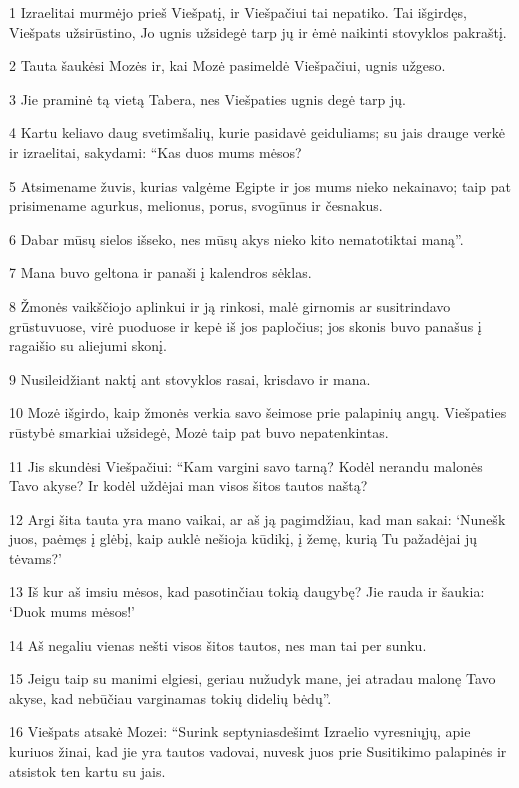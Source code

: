 \par 1 Izraelitai murmėjo prieš Viešpatį, ir Viešpačiui tai nepatiko. Tai išgirdęs, Viešpats užsirūstino, Jo ugnis užsidegė tarp jų ir ėmė naikinti stovyklos pakraštį. 
\par 2 Tauta šaukėsi Mozės ir, kai Mozė pasimeldė Viešpačiui, ugnis užgeso. 
\par 3 Jie praminė tą vietą Tabera, nes Viešpaties ugnis degė tarp jų. 
\par 4 Kartu keliavo daug svetimšalių, kurie pasidavė geiduliams; su jais drauge verkė ir izraelitai, sakydami: “Kas duos mums mėsos? 
\par 5 Atsimename žuvis, kurias valgėme Egipte ir jos mums nieko nekainavo; taip pat prisimename agurkus, melionus, porus, svogūnus ir česnakus. 
\par 6 Dabar mūsų sielos išseko, nes mūsų akys nieko kito nemato­tiktai maną”. 
\par 7 Mana buvo geltona ir panaši į kalendros sėklas. 
\par 8 Žmonės vaikščiojo aplinkui ir ją rinkosi, malė girnomis ar susitrindavo grūstuvuose, virė puoduose ir kepė iš jos papločius; jos skonis buvo panašus į ragaišio su aliejumi skonį. 
\par 9 Nusileidžiant naktį ant stovyklos rasai, krisdavo ir mana. 
\par 10 Mozė išgirdo, kaip žmonės verkia savo šeimose prie palapinių angų. Viešpaties rūstybė smarkiai užsidegė, Mozė taip pat buvo nepatenkintas. 
\par 11 Jis skundėsi Viešpačiui: “Kam vargini savo tarną? Kodėl nerandu malonės Tavo akyse? Ir kodėl uždėjai man visos šitos tautos naštą? 
\par 12 Argi šita tauta yra mano vaikai, ar aš ją pagimdžiau, kad man sakai: ‘Nunešk juos, paėmęs į glėbį, kaip auklė nešioja kūdikį, į žemę, kurią Tu pažadėjai jų tėvams?’ 
\par 13 Iš kur aš imsiu mėsos, kad pasotinčiau tokią daugybę? Jie rauda ir šaukia: ‘Duok mums mėsos!’ 
\par 14 Aš negaliu vienas nešti visos šitos tautos, nes man tai per sunku. 
\par 15 Jeigu taip su manimi elgiesi, geriau nužudyk mane, jei atradau malonę Tavo akyse, kad nebūčiau varginamas tokių didelių bėdų”. 
\par 16 Viešpats atsakė Mozei: “Surink septyniasdešimt Izraelio vyresniųjų, apie kuriuos žinai, kad jie yra tautos vadovai, nuvesk juos prie Susitikimo palapinės ir atsistok ten kartu su jais. 

